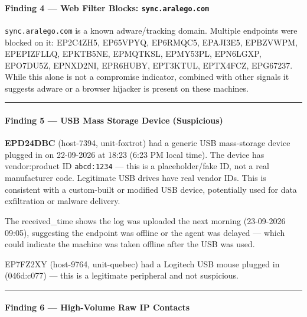 \documentclass[
]{article}
\begin{document}
\paragraph{\texorpdfstring{Finding 4 --- Web Filter Blocks:
\texttt{sync.aralego.com}}{Finding 4 --- Web Filter Blocks: sync.aralego.com}}\label{finding-4-web-filter-blocks-sync.aralego.com}

\texttt{sync.aralego.com} is a known adware/tracking domain. Multiple
endpoints were blocked on it: EP2C4ZH5, EP65VPYQ, EP6RMQC5, EPAJI3E5,
EPBZVWPM, EPEPIZFLLQ, EPKTB5NE, EPMQTKSL, EPMY53PL, EPN6LGXP, EPO7DU5Z,
EPNXD2NI, EPR6HUBY, EPT3KTUL, EPTX4FCZ, EPG67237. While this alone is
not a compromise indicator, combined with other signals it suggests
adware or a browser hijacker is present on these machines.

\begin{center}\rule{0.5\linewidth}{0.5pt}\end{center}

\paragraph{Finding 5 --- USB Mass Storage Device
(Suspicious)}\label{finding-5-usb-mass-storage-device-suspicious}

\textbf{EPD24DBC} (host-7394, unit-foxtrot) had a generic USB
mass-storage device plugged in on 22-09-2026 at 18:23 (6:23 PM local
time). The device has vendor:product ID \texttt{abcd:1234} --- this is a
placeholder/fake ID, not a real manufacturer code. Legitimate USB drives
have real vendor IDs. This is consistent with a custom-built or modified
USB device, potentially used for data exfiltration or malware delivery.

The received\_time shows the log was uploaded the next morning
(23-09-2026 09:05), suggesting the endpoint was offline or the agent was
delayed --- which could indicate the machine was taken offline after the
USB was used.

EP7FZ2XY (host-9764, unit-quebec) had a Logitech USB mouse plugged in
(046d:c077) --- this is a legitimate peripheral and not suspicious.

\begin{center}\rule{0.5\linewidth}{0.5pt}\end{center}

\paragraph{Finding 6 --- High-Volume Raw IP
Contacts}\label{finding-6-high-volume-raw-ip-contacts}
\end{document}
